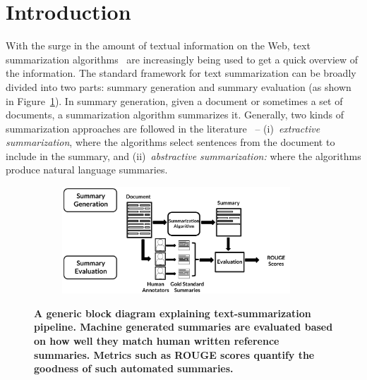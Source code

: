 \section{Introduction}
\noindent
With the surge in the amount of textual information on the Web, text summarization algorithms~\cite{text-summarization-survey,text-summarization-survey-2020} are increasingly being used to get a quick overview of the information. The standard framework for text summarization can be broadly divided into two parts: summary generation and summary evaluation (as shown in Figure~\ref{Fig: Summarization}). 
In summary generation, given a document or sometimes a set of documents, a summarization algorithm summarizes it. Generally, two kinds of summarization approaches are followed in the literature~\cite{text-summarization-survey,text-summarization-survey-2020} -- 
(i)~\textit{extractive summarization}, where the algorithms select sentences from the document to include in the summary, and 
(ii)~\textit{abstractive summarization:} where the algorithms produce natural language summaries. 

\begin{figure}[t]
	\centering
	\begin{subfigure}{0.9\columnwidth}
		\includegraphics[width= \textwidth, height=4cm]{figures/Summarization.pdf}
	\end{subfigure}%
	\caption{{\bf A generic block diagram explaining text-summarization pipeline. Machine generated summaries are evaluated based on how well they match human written reference summaries. Metrics such as ROUGE scores quantify the goodness of such  automated summaries.}}
	\label{Fig: Summarization}
	\vspace{-6 mm}
\end{figure} 

